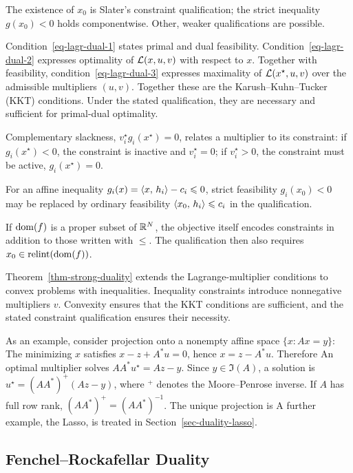 The existence of $x_0$ is Slater's constraint qualification; the strict inequality $g(x_0)<0$ holds componentwise. Other, weaker qualifications are possible.

Condition~\eqref{eq-lagr-dual-1} states primal and dual feasibility.
%
Condition~\eqref{eq-lagr-dual-2} expresses optimality of $\mathcal{L}(x,u,v)$ with respect to $x$.
%
Together with feasibility, condition~\eqref{eq-lagr-dual-3} expresses maximality of $\mathcal{L}(x^\star,u,v)$ over the admissible multipliers $(u,v)$.
%
Together these are the Karush--Kuhn--Tucker (KKT) conditions. Under the stated qualification, they are necessary and sufficient for primal-dual optimality.


Complementary slackness, $v_i^\star g_i(x^\star) = 0$, relates a multiplier to its constraint: if $g_i(x^\star)<0$, the constraint is inactive and $v_i^\star=0$; if $v_i^\star>0$, the constraint must be active, $g_i(x^\star)=0$.

For an affine inequality $g_i(x) = \langle x,\,h_i\rangle - c_i \leqslant 0$, strict feasibility $g_i(x_0)<0$ may be replaced by ordinary feasibility $\langle x_0,\,h_i\rangle \leqslant c_i$ in the qualification.

If $\operatorname{dom}(f)$ is a proper subset of $\mathbb{R}^N$, the objective itself encodes constraints in addition to those written with $\leq$. The qualification then also requires $x_0 \in \operatorname{relint}(\operatorname{dom}(f))$.
	
Theorem~\ref{thm-strong-duality} extends the Lagrange-multiplier conditions to convex problems with inequalities. Inequality constraints introduce nonnegative multipliers $v$. Convexity ensures that the KKT conditions are sufficient, and the stated constraint qualification ensures their necessity.

As an example, consider projection onto a nonempty affine space $\{x:Ax=y\}$:
The minimizing $x$ satisfies $x-z+A^*u=0$, hence $x=z-A^*u$. Therefore
An optimal multiplier solves $AA^*u^\star=Az-y$. Since $y\in\Im(A)$, a solution is $u^\star=(AA^*)^+(Az-y)$, where ${}^+$ denotes the Moore--Penrose inverse. If $A$ has full row rank, $(AA^*)^+=(AA^*)^{-1}$. The unique projection is
A further example, the Lasso, is treated in Section~\ref{sec-duality-lasso}.

\subsection{Fenchel--Rockafellar Duality}

